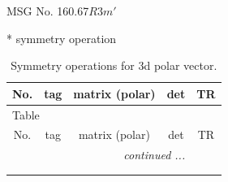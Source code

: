 \documentclass[fleqn,8pt]{jsarticle}
\begin{document}
\setcounter{MaxMatrixCols}{32}

\renewcommand{\tablename}{Table~}
\renewcommand{\figurename}{Figure~}
\begin{center}
\LARGE
MSG No. 160.67\quad$R3m'$
\end{center}
* symmetry operation
\renewcommand{\arraystretch}{1.3}
\begin{longtable}{ccccc}
\caption{Symmetry operations for 3d polar vector.}
 \\
 \hline \hline
No. & tag & matrix (polar) & det & TR \\ \hline \endfirsthead

\multicolumn{4}{l}{\tablename\ \thetable{}} \\
 \hline \hline
No. & tag & matrix (polar) & det & TR \\ \hline \endhead

 \hline \hline
\multicolumn{4}{r}{\footnotesize\it continued ...} \\ \endfoot

 \hline \hline
\multicolumn{4}{r}{} \\ \endlastfoot


\end{longtable}
\end{document}
